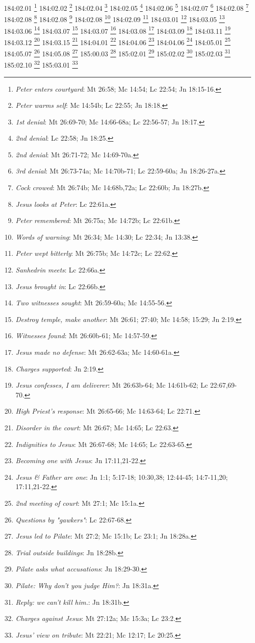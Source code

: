 184:02.01 \footnote{\textit{Peter enters courtyard}: Mt 26:58; Mc 14:54; Lc 22:54; Jn 18:15-16.}
184:02.02 \footnote{\textit{Peter warms self}: Mc 14:54b; Lc 22:55; Jn 18:18.}
184:02.04 \footnote{\textit{1st denial}: Mt 26:69-70; Mc 14:66-68a; Lc 22:56-57; Jn 18:17.}
184:02.05 \footnote{\textit{2nd denial}: Lc 22:58; Jn 18:25.}
184:02.06 \footnote{\textit{2nd denial}: Mt 26:71-72; Mc 14:69-70a.}
184:02.07 \footnote{\textit{3rd denial}: Mt 26:73-74a; Mc 14:70b-71; Lc 22:59-60a; Jn 18:26-27a.}
184:02.08 \footnote{\textit{Cock crowed}: Mt 26:74b; Mc 14:68b,72a; Lc 22:60b; Jn 18:27b.}
184:02.08 \footnote{\textit{Jesus looks at Peter}: Lc 22:61a.}
184:02.08 \footnote{\textit{Peter remembered}: Mt 26:75a; Mc 14:72b; Lc 22:61b.}
184:02.08 \footnote{\textit{Words of warning}: Mt 26:34; Mc 14:30; Lc 22:34; Jn 13:38.}
184:02.09 \footnote{\textit{Peter wept bitterly}: Mt 26:75b; Mc 14:72c; Lc 22:62.}
184:03.01 \footnote{\textit{Sanhedrin meets}: Lc 22:66a.}
184:03.05 \footnote{\textit{Jesus brought in}: Lc 22:66b.}
184:03.06 \footnote{\textit{Two witnesses sought}: Mt 26:59-60a; Mc 14:55-56.}
184:03.07 \footnote{\textit{Destroy temple, make another}: Mt 26:61; 27:40; Mc 14:58; 15:29; Jn 2:19.}
184:03.07 \footnote{\textit{Witnesses found}: Mt 26:60b-61; Mc 14:57-59.}
184:03.08 \footnote{\textit{Jesus made no defense}: Mt 26:62-63a; Mc 14:60-61a.}
184:03.09 \footnote{\textit{Charges supported}: Jn 2:19.}
184:03.11 \footnote{\textit{Jesus confesses, I am deliverer}: Mt 26:63b-64; Mc 14:61b-62; Lc 22:67,69-70.}
184:03.12 \footnote{\textit{High Priest's response}: Mt 26:65-66; Mc 14:63-64; Lc 22:71.}
184:03.15 \footnote{\textit{Disorder in the court}: Mt 26:67; Mc 14:65; Lc 22:63.}
184:04.01 \footnote{\textit{Indignities to Jesus}: Mt 26:67-68; Mc 14:65; Lc 22:63-65.}
184:04.06 \footnote{\textit{Becoming one with Jesus}: Jn 17:11,21-22.}
184:04.06 \footnote{\textit{Jesus & Father are one}: Jn 1:1; 5:17-18; 10:30,38; 12:44-45; 14:7-11,20; 17:11,21-22.}
184:05.01 \footnote{\textit{2nd meeting of court}: Mt 27:1; Mc 15:1a.}
184:05.07 \footnote{\textit{Questions by "gawkers"}: Lc 22:67-68.}
184:05.08 \footnote{\textit{Jesus led to Pilate}: Mt 27:2; Mc 15:1b; Lc 23:1; Jn 18:28a.}
185:00.03 \footnote{\textit{Trial outside buildings}: Jn 18:28b.}
185:02.01 \footnote{\textit{Pilate asks what accusations}: Jn 18:29-30.}
185:02.02 \footnote{\textit{Pilate: Why don't you judge Him?}: Jn 18:31a.}
185:02.03 \footnote{\textit{Reply: we can't kill him.}: Jn 18:31b.}
185:02.10 \footnote{\textit{Charges against Jesus}: Mt 27:12a; Mc 15:3a; Lc 23:2.}
185:03.01 \footnote{\textit{Jesus' view on tribute}: Mt 22:21; Mc 12:17; Lc 20:25.}
